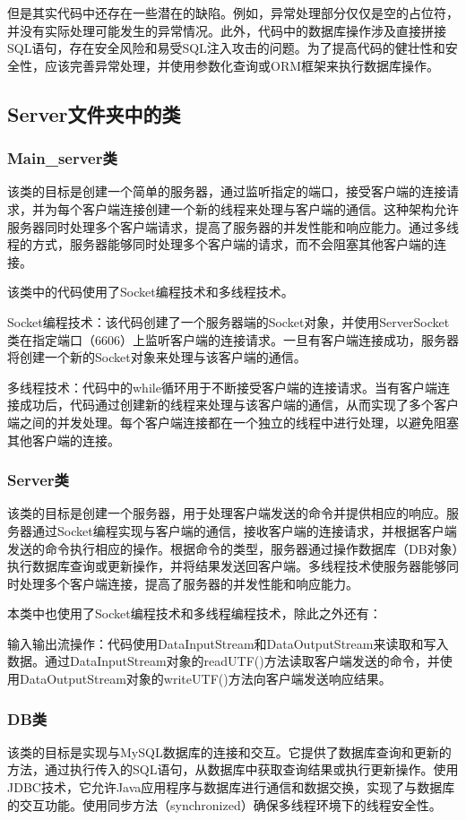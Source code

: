 但是其实代码中还存在一些潜在的缺陷。例如，异常处理部分仅仅是空的占位符，并没有实际处理可能发生的异常情况。此外，代码中的数据库操作涉及直接拼接SQL语句，存在安全风险和易受SQL注入攻击的问题。为了提高代码的健壮性和安全性，应该完善异常处理，并使用参数化查询或ORM框架来执行数据库操作。

\subsection{Server文件夹中的类}
\subsubsection{Main\_server类}
该类的目标是创建一个简单的服务器，通过监听指定的端口，接受客户端的连接请求，并为每个客户端连接创建一个新的线程来处理与客户端的通信。这种架构允许服务器同时处理多个客户端请求，提高了服务器的并发性能和响应能力。通过多线程的方式，服务器能够同时处理多个客户端的请求，而不会阻塞其他客户端的连接。

该类中的代码使用了Socket编程技术和多线程技术。

Socket编程技术：该代码创建了一个服务器端的Socket对象，并使用ServerSocket类在指定端口（6606）上监听客户端的连接请求。一旦有客户端连接成功，服务器将创建一个新的Socket对象来处理与该客户端的通信。

多线程技术：代码中的while循环用于不断接受客户端的连接请求。当有客户端连接成功后，代码通过创建新的线程来处理与该客户端的通信，从而实现了多个客户端之间的并发处理。每个客户端连接都在一个独立的线程中进行处理，以避免阻塞其他客户端的连接。

\subsubsection{Server类}
该类的目标是创建一个服务器，用于处理客户端发送的命令并提供相应的响应。服务器通过Socket编程实现与客户端的通信，接收客户端的连接请求，并根据客户端发送的命令执行相应的操作。根据命令的类型，服务器通过操作数据库（DB对象）执行数据库查询或更新操作，并将结果发送回客户端。多线程技术使服务器能够同时处理多个客户端连接，提高了服务器的并发性能和响应能力。

本类中也使用了Socket编程技术和多线程编程技术，除此之外还有：

输入输出流操作：代码使用DataInputStream和DataOutputStream来读取和写入数据。通过DataInputStream对象的readUTF()方法读取客户端发送的命令，并使用DataOutputStream对象的writeUTF()方法向客户端发送响应结果。

\subsubsection{DB类}
该类的目标是实现与MySQL数据库的连接和交互。它提供了数据库查询和更新的方法，通过执行传入的SQL语句，从数据库中获取查询结果或执行更新操作。使用JDBC技术，它允许Java应用程序与数据库进行通信和数据交换，实现了与数据库的交互功能。使用同步方法（synchronized）确保多线程环境下的线程安全性。

